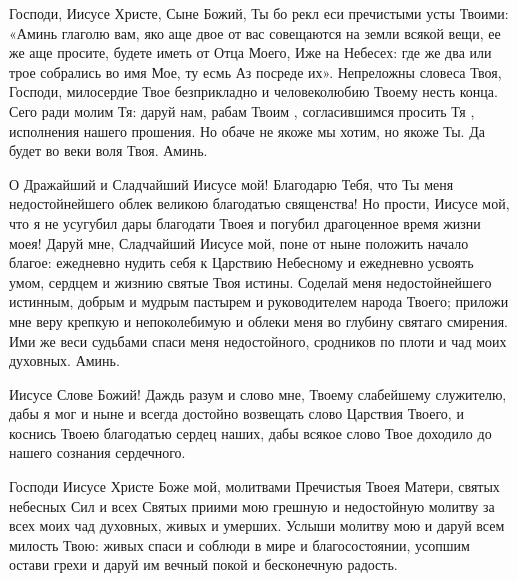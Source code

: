 \mychapterending


\begin{mymulticols}



Господи, Иисусе Христе, Сыне Божий, Ты бо рекл еси пречистыми усты Твоими: «Аминь глаголю вам, яко аще двое от вас совещаются на земли всякой вещи, ее же аще просите, будете иметь от Отца Моего, Иже на Небесех: где же два или трое собрались во имя Мое, ту есмь Аз посреде их». Непреложны словеса Твоя, Господи, милосердие Твое безприкладно и человеколюбию Твоему несть конца. Сего ради молим Тя: даруй нам, рабам Твоим , согласившимся просить Тя , исполнения нашего прошения. Но обаче не якоже мы хотим, но якоже Ты. Да будет во веки воля Твоя. Аминь.

\end{mymulticols}

\mychapterending


\begin{mymulticols}




О Дражайший и Сладчайший Иисусе мой! Благодарю Тебя, что Ты меня недостойнейшего облек великою благодатью священства! Но прости, Иисусе мой, что я не усугубил дары благодати Твоея и погубил драгоценное время жизни моея! Даруй мне, Сладчайший Иисусе мой, поне от ныне положить начало благое: ежедневно нудить себя к Царствию Небесному и ежедневно усвоять умом, сердцем и жизнию святые Твоя истины. Соделай меня недостойнейшего истинным, добрым и мудрым пастырем и руководителем народа Твоего; приложи мне веру крепкую и непоколебимую и облеки меня во глубину святаго смирения. Ими же веси судьбами спаси меня недостойного, сродников по плоти и чад моих духовных. Аминь.

\end{mymulticols}

\mychapterending


\begin{mymulticols}




Иисусе Слове Божий! Даждь разум и слово мне, Твоему слабейшему служителю, дабы я мог и ныне и всегда достойно возвещать слово Царствия Твоего, и коснись Твоею благодатью сердец наших, дабы всякое слово Твое доходило до нашего сознания сердечного.


Господи Иисусе Христе Боже мой, молитвами Пречистыя Твоея Матери, святых небесных Сил и всех Святых приими мою грешную и недостойную молитву за всех моих чад духовных, живых и умерших. Услыши молитву мою и даруй всем милость Твою: живых спаси и соблюди в мире и благосостоянии, усопшим остави грехи и даруй им вечный покой и бесконечную радость.




\end{mymulticols}

